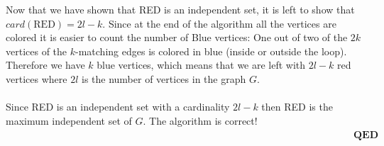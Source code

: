 \documentclass[10pt,a4paper]{article}
\begin{document}
Now that we have shown that RED is an independent set, it is left to show that $card(\text{RED}) = 2l - k$. Since at the end of the algorithm all the vertices are colored it is easier to count the number of Blue vertices: One out of two of the $2k$ vertices of the $k$-matching edges is colored in blue (inside or outside the loop). Therefore we have $k$ blue vertices, which means that we are left with $2l-k$ red vertices where $2l$ is the number of vertices in the graph $G$.\\\\

Since RED is an independent set with a cardinality $2l-k$ then RED is the maximum independent set of $G$. The algorithm is correct! $\quad \quad \quad\quad\quad\quad \quad \quad\quad\quad\quad \quad \quad\quad \quad \quad\quad\quad \quad \quad\quad\quad\quad\quad\quad\quad \quad \quad\quad\quad\quad \quad \quad\quad\quad \textbf{QED}$
\end{document}
